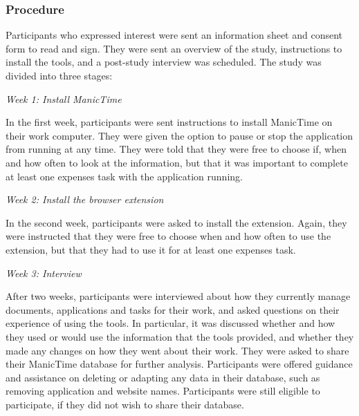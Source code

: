 \subsubsection{Procedure}
Participants who expressed interest were sent an information sheet and consent form to read and sign. They were sent an overview of the study, instructions to install the tools, and a post-study interview was scheduled.
The study was divided into three stages:

\textit{Week 1: Install ManicTime}

In the first week, participants were sent instructions to install ManicTime on their work computer. They were given the option to pause or stop the application from running at any time. They were told that they were free to choose if, when and how often to look at the information, but that it was important to complete at least one expenses task with the application running. 

\textit{Week 2: Install the browser extension}

In the second week, participants were asked to install the extension. Again, they were instructed that they were free to choose when and how often to use the extension, but that they had to use it for at least one expenses task. %

\textit{Week 3: Interview}

After two weeks, participants were interviewed about how they currently manage documents, applications and tasks for their work, and asked questions on their experience of using the tools. In particular, it was discussed whether and how they used or would use the information that the tools provided, and whether they made any changes on how they went about their work. They were asked to share their ManicTime database for further analysis. Participants were offered guidance and assistance on deleting or adapting any data in their database, such as removing application and website names. Participants were still eligible to participate, if they did not wish to share their database.

